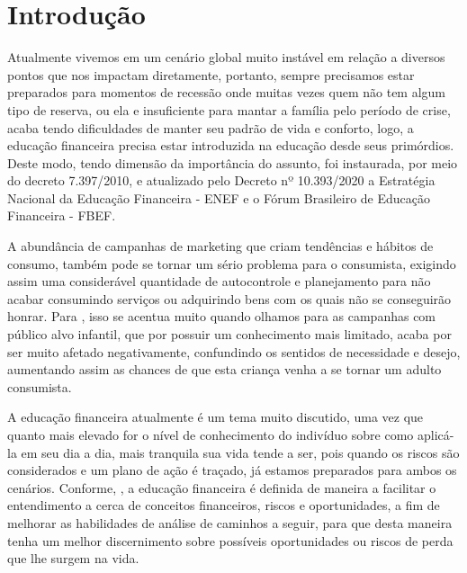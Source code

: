 


\chapter{Introdução}

Atualmente vivemos em um cenário global muito instável em relação a diversos pontos que nos impactam diretamente, portanto, sempre precisamos estar preparados para momentos de recessão onde muitas vezes quem não tem algum tipo de reserva, ou ela e insuficiente para mantar a família pelo período de crise, acaba tendo dificuldades de manter seu padrão de vida e conforto, logo, a educação financeira precisa estar introduzida na educação desde seus primórdios. Deste modo, tendo dimensão da importância do assunto, foi instaurada, por meio do decreto 7.397/2010, e atualizado pelo Decreto nº 10.393/2020 a Estratégia Nacional da Educação Financeira - ENEF e o Fórum Brasileiro de Educação Financeira - FBEF.\cite{decreto_10939}

A abundância de campanhas de marketing que criam tendências e hábitos de consumo, também pode se tornar um sério problema para o consumista, exigindo assim uma considerável quantidade de autocontrole e planejamento para não acabar consumindo serviços ou adquirindo bens com os quais não se conseguirão honrar. Para \cite{Junger_Medeiros_Moura_Barrocal_Amaral_2019}, isso se acentua muito quando olhamos para as campanhas com público alvo infantil, que por possuir um conhecimento mais limitado, acaba por ser muito afetado negativamente, confundindo os sentidos de necessidade e desejo, aumentando assim as chances de que esta criança venha a se tornar um adulto consumista.

A educação financeira atualmente é um tema muito discutido, uma vez que quanto mais elevado for o nível de conhecimento do indivíduo sobre como aplicá-la em seu dia a dia, mais tranquila sua vida tende a ser, pois quando os riscos são considerados e um plano de ação é traçado, já estamos preparados para ambos os cenários. Conforme, \cite{OECD}, a educação financeira é definida de maneira a facilitar o entendimento a cerca de conceitos financeiros, riscos e oportunidades, a fim de melhorar as habilidades de análise de caminhos a seguir, para que desta maneira tenha um melhor discernimento sobre possíveis oportunidades ou riscos de perda que lhe surgem na vida.













